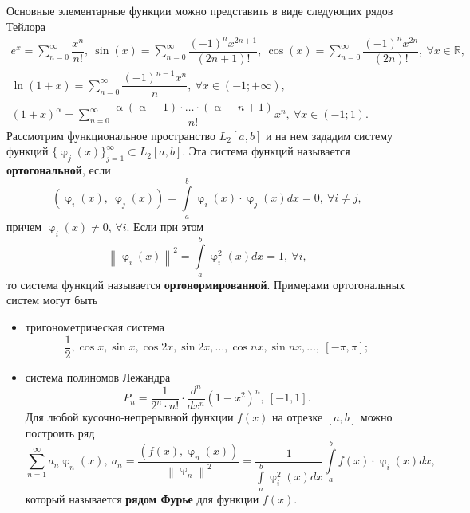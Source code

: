 \documentclass[a4paper, 12pt]{report}
\numberwithin{equation}{section}
\renewcommand{\alpha}{\upalpha}
\renewcommand{\varphi}{\upvarphi}
\newcommand\Norm[1]{\left\| #1 \right\|}
\begin{document}
	\\\\
	Основные элементарные функции можно представить в виде следующих рядов Тейлора
	\begin{equation*}
		\begin{gathered}
			e^x = \sum_{n=0}^\infty \dfrac{x^n}{n!},\ \sin (x) = \sum_{n=0}^\infty \dfrac{(-1)^nx^{2n+1}}{(2n+1)!},\ \cos(x) = \sum_{n=0}^{\infty}\dfrac{(-1)^nx^{2n}}{(2n)!},\ \forall x \in \mathbb R ,\\
			\ln(1+x) = \sum_{n=0}^{\infty} \dfrac{(-1)^{n-1}x^n}{n},\ \forall x \in (-1; +\infty),\\
			(1+x)^\alpha = \sum_{n=0}^{\infty} \dfrac{\alpha(\alpha-1)\cdot \ldots \cdot (\alpha - n + 1)}{n!}x^n,\ \forall x \in (-1; 1).
		\end{gathered}
	\end{equation*}
	Рассмотрим функциональное пространство $L_2[a,b]$ и на нем зададим систему функций $\{\varphi_j(x)\}_{j=1}^\infty\subset L_2[a,b]$. Эта система функций называется \textbf{ортогональной}, если 
	\begin{equation*}
		(\varphi_i(x),\ \varphi_j(x)) = \int\limits_a^b\varphi_i(x)\cdot \varphi_j(x)dx = 0,\ \forall i \ne j, 
	\end{equation*}
	причем $\varphi_i(x) \ne 0$, $\forall i$. Если при этом 
	\begin{equation*}
		\Norm{\varphi_i(x)}^2 = \int\limits_a^b\varphi_i^2(x)dx = 1,\ \forall i, 
	\end{equation*}
	то система функций называется \textbf{ортонормированной}.
	Примерами ортогональных систем могут быть
	\begin{itemize}
		\item тригонометрическая система
		\begin{equation*}
			\dfrac 1 2, \cos x, \sin x, \cos 2 x, \sin 2 x,\ldots, \cos n x, \sin n x,\ldots,\ [-\pi, \pi];
		\end{equation*}
		\item система полиномов Лежандра
		\begin{equation*}
			P_n= \dfrac{1}{2^n \cdot n!} \cdot \dfrac{d^n}{dx^n}(1-x^2)^n,\ [-1,1].
		\end{equation*}
		Для любой кусочно-непрерывной функции $f(x)$ на отрезке $[a,b]$ можно построить ряд
		\begin{equation*}
			\sum_{n=1}^\infty a_n \varphi_n(x),\ a_n = \dfrac{(f(x), \varphi_n(x))}{\Norm{\varphi_n}^2} = \dfrac{1}{\int\limits_a^b \varphi^2_i(x)dx}\int\limits_a^b f(x)\cdot \varphi_i(x)dx,
		\end{equation*}
		который называется \textbf{рядом Фурье} для функции $f(x)$.
	\end{itemize}
\end{document}

